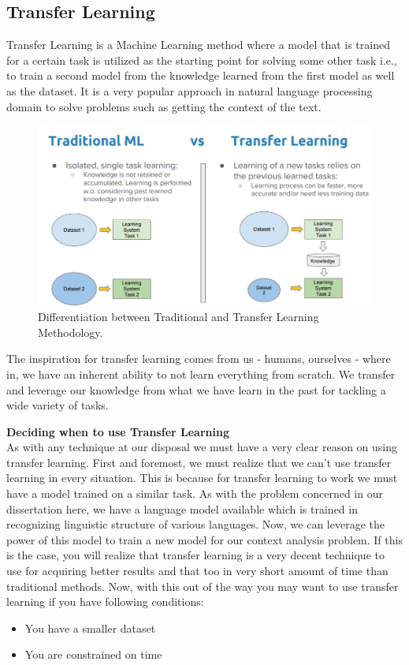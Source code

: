 \documentclass[a4paper, 12pt]{article}
\begin{document}
\begin{sloppypar}
\subsection{Transfer Learning}
Transfer Learning is a Machine Learning method where a model that is trained for a certain task is utilized as the starting point for solving some other task i.e., to train a second model from the knowledge learned from the first model as well as the dataset. It is a very popular approach in natural language processing domain to solve problems such as getting the context of the text.

\begin{figure}[H]
\begin{center}
\includegraphics[scale=0.45]{tl.png}
\caption{Differentiation between Traditional and Transfer Learning Methodology. \label{tl}} %
\end{center}
\end{figure}

The inspiration for transfer learning comes from us - humans, ourselves - where in, we have an inherent ability to not learn everything from scratch. We transfer and leverage our knowledge from what we have learn in the past for tackling a wide variety of tasks.\cite{sarkar_deep_2018}

\large \textbf{Deciding when to use Transfer Learning} \\ [0.5ex]
\normalsize
As with any technique at our disposal we must have a very clear reason on using transfer learning. First and foremost, we must realize that we can't use transfer learning in every situation. This is because for transfer learning to work we must have a model trained on a similar task. As with the problem concerned in our dissertation here, we have  a language model available which is trained in recognizing linguistic structure of  various languages. Now, we can leverage the power of this model to train a new model for our context analysis problem. If this is the case, you will realize that transfer learning is a very decent technique to use for acquiring better results and that too in very short amount of time than traditional methods. Now, with this out of the way you may want to use transfer learning if you have following conditions:
\begin{itemize}
\item{You have a smaller dataset}
\item{You are constrained on time}
\end{itemize}


\end{sloppypar}
\end{document}
